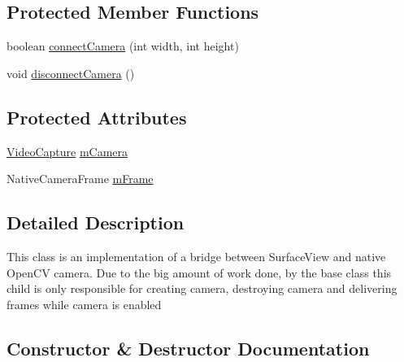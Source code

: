 \subsection*{Protected Member Functions}
\begin{DoxyCompactItemize}
\item 
boolean \mbox{\hyperlink{classorg_1_1opencv_1_1android_1_1_native_camera_view_aac18d107ffde4f8f1c05e684490aab1a}{connect\+Camera}} (int width, int height)
\item 
void \mbox{\hyperlink{classorg_1_1opencv_1_1android_1_1_native_camera_view_ae685ed7e3c4b774dd72f0964f0cea032}{disconnect\+Camera}} ()
\end{DoxyCompactItemize}
\subsection*{Protected Attributes}
\begin{DoxyCompactItemize}
\item 
\mbox{\hyperlink{classorg_1_1opencv_1_1highgui_1_1_video_capture}{Video\+Capture}} \mbox{\hyperlink{classorg_1_1opencv_1_1android_1_1_native_camera_view_a00ebc0483a18511d6e4311b209bc1f22}{m\+Camera}}
\item 
Native\+Camera\+Frame \mbox{\hyperlink{classorg_1_1opencv_1_1android_1_1_native_camera_view_ad130fc7f3d4b4600f50dd0b7945a6ded}{m\+Frame}}
\end{DoxyCompactItemize}


\subsection{Detailed Description}
This class is an implementation of a bridge between Surface\+View and native Open\+CV camera. Due to the big amount of work done, by the base class this child is only responsible for creating camera, destroying camera and delivering frames while camera is enabled 

\subsection{Constructor \& Destructor Documentation}
\mbox{\label{classorg_1_1opencv_1_1android_1_1_native_camera_view_a5443d2ef3ae99f3e45843da42f4a7548}} 
